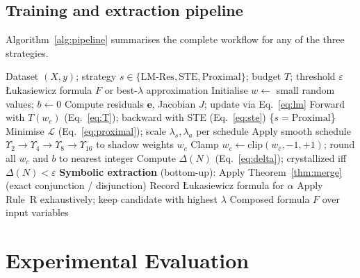 \documentclass[12pt,a4paper]{article}
\newcommand{\LNN}{\L{}NN}
\begin{document}
\subsection{Training and extraction pipeline}
\label{ssec:pipeline}

Algorithm~\ref{alg:pipeline} summarises the complete workflow for any of the
three strategies.

\begin{algorithm}
\caption{\LNN{} training and symbolic extraction}
\label{alg:pipeline}
\begin{algorithmic}[1]
\REQUIRE Dataset $(X, y)$; strategy $s \in \{\mathrm{LM\text{-}Res},
         \mathrm{STE}, \mathrm{Proximal}\}$; budget $T$; threshold $\varepsilon$
\ENSURE \L{}ukasiewicz formula $F$ or best-$\lambda$ approximation
\STATE Initialise $w \leftarrow$ small random values; $b \leftarrow 0$
    \STATE Compute residuals $\mathbf{e}$, Jacobian $J$; update via
           Eq.~\eqref{eq:lm}
    \STATE Forward with $T(w_c)$ (Eq.~\eqref{eq:T}); backward with
           STE (Eq.~\eqref{eq:ste})
  \ELSE
    \STATE \{$s = \mathrm{Proximal}$\} Minimise $\mathcal{L}$
           (Eq.~\eqref{eq:proximal}); scale $\lambda_s, \lambda_a$ per schedule
  \ENDIF
    \STATE Apply smooth schedule
           $\Upsilon_2 \!\to\! \Upsilon_4 \!\to\! \Upsilon_8 \!\to\! \Upsilon_{16}$
           to shadow weights $w_c$
  \ENDIF
\ENDFOR
\STATE Clamp $w_c \leftarrow \mathrm{clip}(w_c, -1, +1)$; round all $w_c$
       and $b$ to nearest integer
\STATE Compute $\Delta(N)$ (Eq.~\eqref{eq:delta}); crystallized iff
       $\Delta(N) < \varepsilon$
\STATE \textbf{Symbolic extraction} (bottom-up):
    \STATE Apply Theorem~\ref{thm:merge} (exact conjunction / disjunction)
    \STATE Record \L{}ukasiewicz formula for $\alpha$
  \ELSE
    \STATE Apply Rule~R exhaustively; keep candidate with highest $\lambda$
  \ENDIF
\ENDFOR
\RETURN Composed formula $F$ over input variables
\end{algorithmic}
\end{algorithm}

\section{Experimental Evaluation}
\label{sec:experiments}
\end{document}
